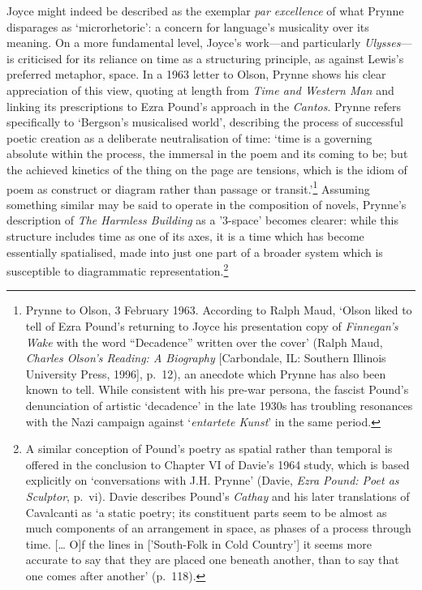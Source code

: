 \documentclass[]{article}
\begin{document}
Joyce might indeed be described as the exemplar \emph{par excellence} of
what Prynne disparages as `microrhetoric': a concern for language's
musicality over its meaning. On a more fundamental level, Joyce's
work---and particularly \emph{Ulysses}---is criticised for its reliance
on time as a structuring principle, as against Lewis's preferred
metaphor, space. In a 1963 letter to Olson, Prynne shows his clear
appreciation of this view, quoting at length from \emph{Time and Western
Man} and linking its prescriptions to Ezra Pound's approach in the
\emph{Cantos}. Prynne refers specifically to `Bergson's musicalised
world', describing the process of successful poetic creation as a
deliberate neutralisation of time: `time is a governing absolute within
the process, the immersal in the poem and its coming to be; but the
achieved kinetics of the thing on the page are tensions, which is the
idiom of poem as construct or diagram rather than passage or
transit.'\footnote{Prynne to Olson, 3 February 1963. According to Ralph
  Maud, `Olson liked to tell of Ezra Pound's returning to Joyce his
  presentation copy of \emph{Finnegan's Wake} with the word
  ``Decadence'' written over the cover' (Ralph Maud, \emph{Charles
  Olson's Reading: A Biography} {[}Carbondale, IL: Southern Illinois
  University Press, 1996{]}, p.~12), an anecdote which Prynne has also
  been known to tell. While consistent with his pre-war persona, the
  fascist Pound's denunciation of artistic `decadence' in the late 1930s
  has troubling resonances with the Nazi campaign against
  `\emph{entartete Kunst}' in the same period.} Assuming something
similar may be said to operate in the composition of novels, Prynne's
description of \emph{The Harmless Building} as a '3-space' becomes
clearer: while this structure includes time as one of its axes, it is a
time which has become essentially spatialised, made into just one part
of a broader system which is susceptible to diagrammatic
representation.\footnote{A similar conception of Pound's poetry as
  spatial rather than temporal is offered in the conclusion to Chapter
  VI of Davie's 1964 study, which is based explicitly on `conversations
  with J.H. Prynne' (Davie, \emph{Ezra Pound: Poet as Sculptor}, p.~vi).
  Davie describes Pound's \emph{Cathay} and his later translations of
  Cavalcanti as `a static poetry; its constituent parts seem to be
  almost as much components of an arrangement in space, as phases of a
  process through time. {[}\ldots{} O{]}f the lines in {[}'South-Folk in
  Cold Country'{]} it seems more accurate to say that they are placed
  one beneath another, than to say that one comes after another'
  (p.~118).}
\end{document}
